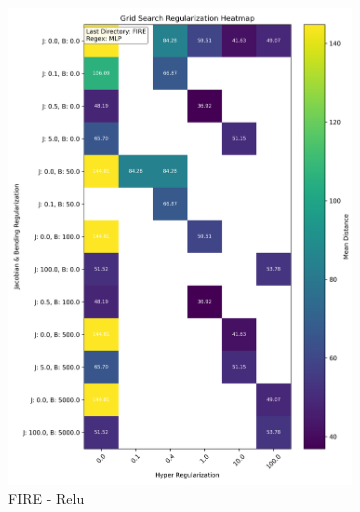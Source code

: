 \begin{figure}[ht]
    \centering
    \begin{subfigure}[b]{0.4\textwidth}
        \centering
        \includegraphics[width=\textwidth]{imaxes/grid_search_single_heatmap_FIRE_MLP.png}
        \caption{FIRE - Relu}
        \label{fig:gs_single_FIRE_MLP}
    \end{subfigure}\hfill
    \begin{subfigure}[b]{0.4\textwidth}
        \centering

\end{subfigure}
\end{figure}
